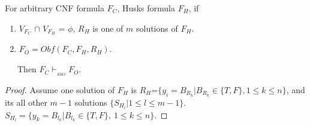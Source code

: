 \documentclass[conference,compsocconf]{IEEEtran}
\begin{document}
For arbitrary CNF formula $F_C$, Husks formula $F_H$, if
\begin{enumerate}
 \item $V_{F_C}$ $\cap$ $V_{F_H}$ = $\phi$, $R_H$ is one of $m$ solutions of $F_H$.
 \item $F_O=Obf(F_C,F_H,R_H)$.
\end{enumerate}
~~~Then $F_C \vdash_{_{SSO}} F_O$.
\begin{proof}

Assume 
        one solution of $F_H$ is $R_H$=$\{y_i=B_{R_k}|B_{R_k} \in \{T,F\}, 1\leqslant k\leqslant n\}$,
        and its all other $m-1$ solutions $\{S_{H_l} | 1\leqslant l\leqslant m-1\}$.
        $S_{H_l}=\{y_k=B_{l_k}|B_{l_k}\in \{ T,F \},~1\leqslant k\leqslant n\}$.   
        

\end{proof}
\end{document}
